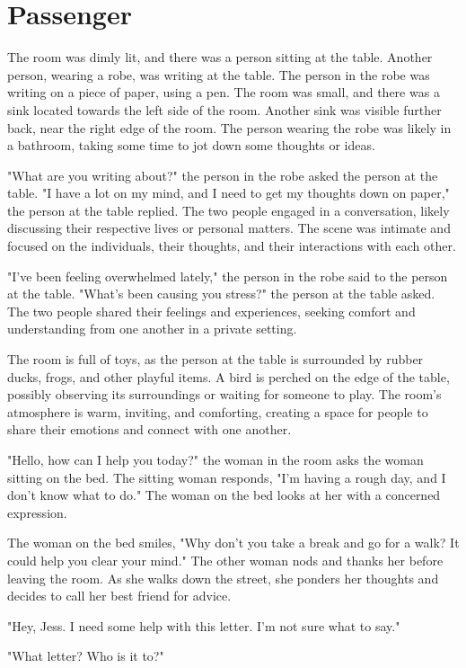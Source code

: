 \documentclass[smalldemyvopaper,11pt,twoside,onecolumn,openright,extrafontsizes]{memoir}
\begin{document}
\chapter{Passenger}
The room was dimly lit, and there was a person sitting at the table. Another person, wearing a robe, was writing at the table. The person in the robe was writing on a piece of paper, using a pen. The room was small, and there was a sink located towards the left side of the room. Another sink was visible further back, near the right edge of the room. The person wearing the robe was likely in a bathroom, taking some time to jot down some thoughts or ideas.\par
"What are you writing about?" the person in the robe asked the person at the table. "I have a lot on my mind, and I need to get my thoughts down on paper," the person at the table replied. The two people engaged in a conversation, likely discussing their respective lives or personal matters. The scene was intimate and focused on the individuals, their thoughts, and their interactions with each other.\par
"I've been feeling overwhelmed lately," the person in the robe said to the person at the table. "What's been causing you stress?" the person at the table asked. The two people shared their feelings and experiences, seeking comfort and understanding from one another in a private setting.\par
The room is full of toys, as the person at the table is surrounded by rubber ducks, frogs, and other playful items. A bird is perched on the edge of the table, possibly observing its surroundings or waiting for someone to play. The room's atmosphere is warm, inviting, and comforting, creating a space for people to share their emotions and connect with one another.\par
"Hello, how can I help you today?" the woman in the room asks the woman sitting on the bed. The sitting woman responds, "I'm having a rough day, and I don't know what to do." The woman on the bed looks at her with a concerned expression.\par
The woman on the bed smiles, "Why don't you take a break and go for a walk? It could help you clear your mind." The other woman nods and thanks her before leaving the room. As she walks down the street, she ponders her thoughts and decides to call her best friend for advice.\par
"Hey, Jess. I need some help with this letter. I'm not sure what to say."\par
"What letter? Who is it to?"\par
\end{document}

